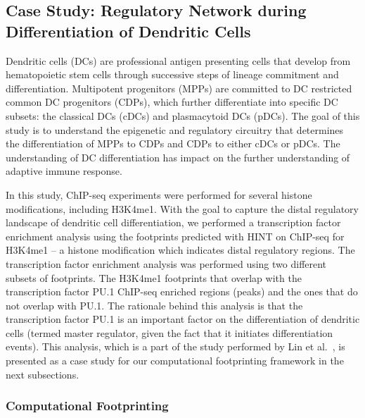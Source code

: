 \subsection{Case Study: Regulatory Network during Differentiation of Dendritic Cells}
\label{sec:case.study.dendritic}

Dendritic cells (DCs) are professional antigen presenting cells that develop from hematopoietic stem cells through successive steps of lineage commitment and differentiation. Multipotent progenitors (MPPs) are committed to DC restricted common DC progenitors (CDPs), which further differentiate into specific DC subsets: the classical DCs (cDCs) and plasmacytoid DCs (pDCs). The goal of this study is to understand the epigenetic and regulatory circuitry that determines the differentiation of MPPs to CDPs and CDPs to either cDCs or pDCs. The understanding of DC differentiation has impact on the further understanding of adaptive immune response.

In this study, ChIP-seq experiments were performed for several histone modifications, including H3K4me1. With the goal to capture the distal regulatory landscape of dendritic cell differentiation, we performed a transcription factor enrichment analysis using the footprints predicted with HINT on ChIP-seq for H3K4me1 -- a histone modification which indicates distal regulatory regions. The transcription factor enrichment analysis was performed using two different subsets of footprints. The H3K4me1 footprints that overlap with the transcription factor PU.1 ChIP-seq enriched regions (peaks) and the ones that do not overlap with PU.1. The rationale behind this analysis is that the transcription factor PU.1 is an important factor on the differentiation of dendritic cells (termed master regulator, given the fact that it initiates differentiation events). This analysis, which is a part of the study performed by Lin et al.~\cite{lin2015}, is presented as a case study for our computational footprinting framework in the next subsections.

\subsubsection{Computational Footprinting}
\label{sec:cs1.computational.footprinting}

